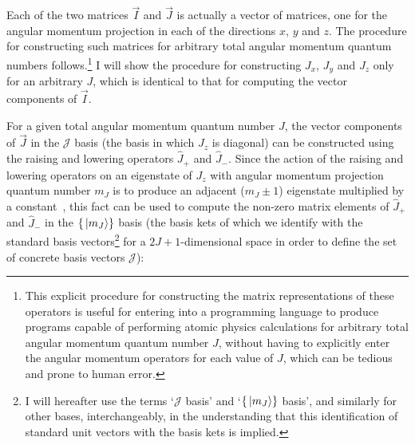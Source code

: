 Each of the two matrices $\vec I$ and $\vec J$ is actually a vector of matrices, one for the angular momentum projection in each of the directions $x$, $y$ and $z$. The procedure for constructing such matrices for arbitrary total angular momentum quantum numbers follows.\footnote{This explicit procedure for constructing the matrix representations of these operators is useful for entering into a programming language to produce programs capable of performing atomic physics calculations for arbitrary total angular momentum quantum number $J$, without having to explicitly enter the angular momentum operators for each value of $J$, which can be tedious and prone to human error.} I will show the procedure for constructing $J_x$, $J_y$ and $J_z$ only for an arbitrary $J$, which is identical to that for computing the vector components of $\vec I$.

For a given total angular momentum quantum number $J$, the vector components of $\vec J$ in the $\mathcal{J}$ basis (the basis in which $J_z$ is diagonal) can be constructed using the raising and lowering operators $\hat J_+$ and $\hat J_-$. Since the action of the raising and lowering operators on an eigenstate of $J_z$ with angular momentum projection quantum number $m_J$ is to produce an adjacent ($m_J \pm 1$) eigenstate multiplied by a constant~\cite[p 192]{sakurai_modern_1994}, this fact can be used to compute the non-zero matrix elements of $\hat J_+$ and $\hat J_-$ in the $\{\ket{m_J}\}$ basis (the basis kets of which we identify with the standard basis vectors\footnote{I will hereafter use the terms `$\mathcal{J}$ basis' and `$\{\ket{m_J}\}$ basis', and similarly for other bases, interchangeably, in the understanding that this identification of standard unit vectors with the basis kets is implied.} for a $2J+1$-dimensional space in order to define the set of concrete basis vectors $\mathcal{J}$):

